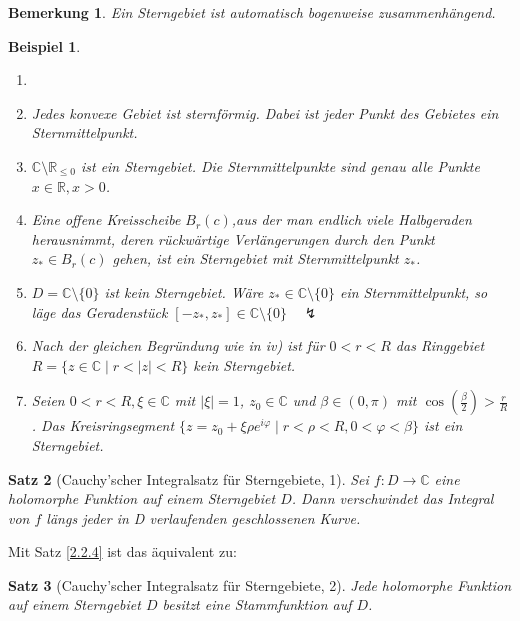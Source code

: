 \documentclass[a4paper,12pt]{article}
\theoremstyle{newthm}
\newtheorem{thm}{Satz}[subsection]
\theoremstyle{newdef}
\theoremstyle{newrem}
\newtheorem{exmp}[thm]{Beispiel}
\newtheorem*{rem}{Bemerkung}
\newcommand{\R}{\mathbb{R}}
\newcommand{\C}{\mathbb{C}}
\begin{document}
		\begin{rem}
			Ein Sterngebiet ist automatisch bogenweise zusammenhängend.
		\end{rem}
		
		\begin{exmp}
			\begin{enumerate}[label = {\roman*})]
				\item[]
				\item Jedes konvexe Gebiet ist sternförmig. Dabei ist jeder Punkt des Gebietes ein Sternmittelpunkt.
				\item $ \C \setminus \R_{\leq 0} $ ist ein Sterngebiet. Die Sternmittelpunkte sind genau alle Punkte $ x \in \R, x > 0 $.
				\item Eine offene Kreisscheibe $ B_r(c) $,aus der man endlich viele Halbgeraden herausnimmt, deren rückwärtige Verlängerungen durch den Punkt $z_* \in B_r(c)$ gehen, ist ein Sterngebiet mit Sternmittelpunkt $z_*$.
				\item $ D = \C \setminus \{0\} $ ist \emph{kein} Sterngebiet. Wäre $ z_* \in \C \setminus\{0\} $ ein Sternmittelpunkt, so läge das Geradenstück $ [-z_*,z_*] \in \C \setminus \{0\} \quad \lightning $
				\item Nach der gleichen Begründung wie in iv) ist für $ 0<r<R $ das Ringgebiet $ R = \{ z \in \C \mid r < |z| < R \} $ kein Sterngebiet.
				\item Seien $ 0<r<R, \xi \in \C $ mit $ |\xi|=1 $, $z_0 \in \C$ und $ \beta \in (0,\pi) $ mit $ \cos\left(\frac{\beta}{2}\right) > \frac{r}{R} $. Das Kreisringsegment $ \{ z = z_0 + \xi\rho e^{i\varphi} \mid r<\rho<R, 0<\varphi<\beta \} $ ist ein Sterngebiet.
			\end{enumerate}
		\end{exmp}
		
		\begin{thm}[Cauchy'scher Integralsatz für Sterngebiete, 1]
			Sei $ f: D \to \C $ eine holomorphe Funktion auf einem Sterngebiet $D$. Dann verschwindet das Integral von $f$ längs jeder in D verlaufenden geschlossenen Kurve.
		\end{thm}
		
		Mit Satz \ref{2.2.4} ist das äquivalent zu:
		
		\begin{thm}[Cauchy'scher Integralsatz für Sterngebiete, 2]\label{2.2.8}
			Jede holomorphe Funktion auf einem Sterngebiet $D$ besitzt eine Stammfunktion auf $D$.
		\end{thm}
		
\end{document}
